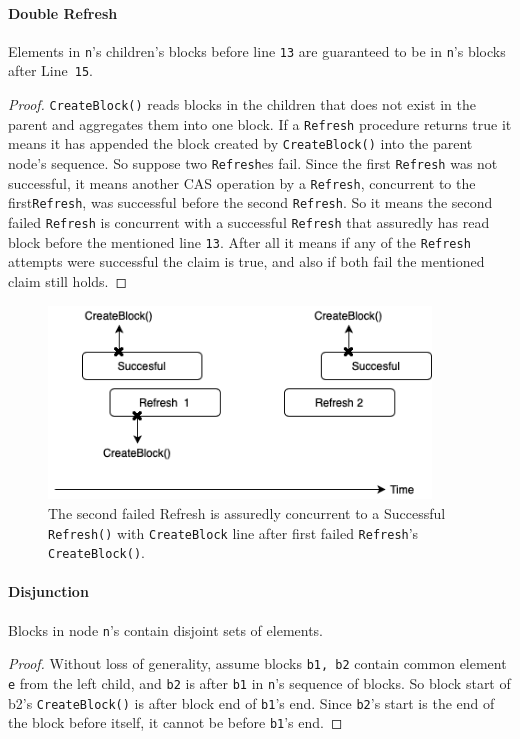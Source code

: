 \documentclass[10pt]{article}
\theoremstyle{definition}
\begin{document}
\paragraph{Double Refresh}
Elements in \texttt{n}'s children's blocks before line \texttt{13} are guaranteed to be in \texttt{n}'s blocks after Line~\texttt{15}.
\begin{proof}
\texttt{CreateBlock()} reads blocks in the children that does not exist in the parent and aggregates them into one block. If a \texttt{Refresh} procedure returns true it means it has appended the block created by \texttt{CreateBlock()} into the parent node's sequence. So suppose two \texttt{Refresh}es fail. Since the first \texttt{Refresh} was not successful, it means another CAS operation by a \texttt{Refresh}, concurrent to the first\texttt{Refresh}, was successful before the second \texttt{Refresh}. So it means the second failed \texttt{Refresh} is concurrent with a successful \texttt{Refresh} that assuredly has read block before the mentioned line \texttt{13}. After all it means if any of the \texttt{Refresh} attempts were successful the claim is true, and also if both fail the mentioned claim still holds.
\end{proof}
\begin{figure}[hbt]
  \center\includegraphics[width=4in]{pics/doublerefresh.png}
  \caption{The second failed Refresh is assuredly concurrent to a Successful \texttt{Refresh()} with \texttt{CreateBlock} line after first failed \texttt{Refresh}'s \texttt{CreateBlock()}.}
\end{figure}


\paragraph{Disjunction} Blocks in node \texttt{n}'s contain disjoint sets of elements.
\begin{proof}
Without loss of generality, assume blocks \texttt{b1, b2} contain common element \texttt{e} from the left child, and \texttt{b2} is after \texttt{b1} in \texttt{n}'s sequence of blocks. So block start of b2's \texttt{CreateBlock()} is after block end of \texttt{b1}'s end. Since \texttt{b2}'s start is the end of the block before itself, it cannot be before \texttt{b1}'s end.
\end{proof}
\end{document}
